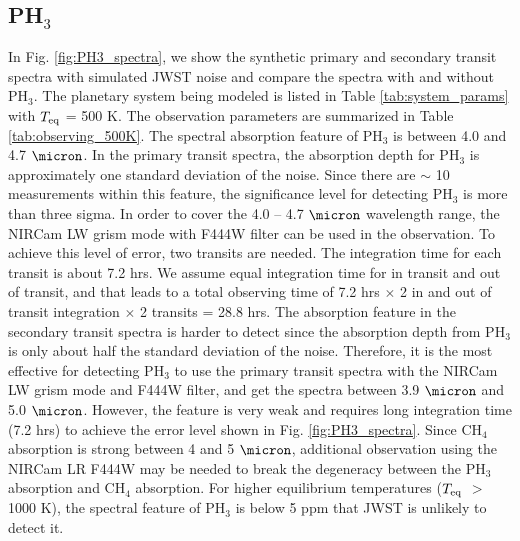 \documentclass[twocolumn]{aastex61}
\begin{document}
\subsection{PH$_3$}
In Fig. \ref{fig:PH3_spectra}, we show the synthetic primary and secondary transit spectra with simulated JWST noise and compare the spectra with and without PH$_3$. The planetary system being modeled is listed in Table \ref{tab:system_params} with $T_{\rm eq}$ = 500 K. The observation parameters are summarized in Table \ref{tab:observing_500K}. The spectral absorption feature of PH$_3$ is between 4.0 and 4.7 $\micron$. In the primary transit spectra, the absorption depth for PH$_3$ is approximately one standard deviation of the noise. Since there are $\sim$ 10 measurements within this feature, the significance level for detecting PH$_3$ is more than three sigma.  In order to cover the 4.0 -- 4.7 $\micron$ wavelength range, the NIRCam LW grism mode with F444W filter can be used in the observation. To achieve this level of error, two transits are needed. The integration time for each transit is about 7.2 hrs. We assume equal integration time for in transit and out of transit, and that leads to a total observing time of 7.2 hrs $\times$ 2 in and out of transit integration $\times$ 2 transits = 28.8 hrs.  
The absorption feature in the secondary transit spectra is harder to detect since the absorption depth from PH$_3$ is only about half the standard deviation of the noise. Therefore, it is the most effective for detecting PH$_3$ to use the primary transit spectra with the NIRCam LW grism mode and F444W filter, and get the spectra between 3.9 $\micron$ and 5.0 $\micron$. However, the feature is very weak and requires long integration time (7.2 hrs) to achieve the error level shown in Fig. \ref{fig:PH3_spectra}. Since CH$_4$ absorption is strong between 4 and 5 $\micron$, additional observation using the NIRCam LR F444W may be needed to break the degeneracy between the PH$_3$ absorption and CH$_4$ absorption. 
For higher equilibrium temperatures ($T_{\rm eq}$ $>$ 1000 K), the spectral feature of PH$_3$ is below 5 ppm that JWST is unlikely to detect it. 
\end{document}
